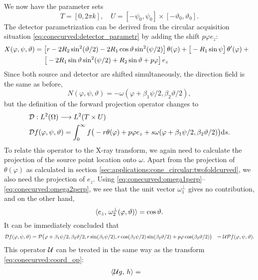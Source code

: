 \documentclass{amsart}
\renewcommand*{\phi}{\varphi}
\begin{document}
We now have the parameter sets
%
\begin{equation}
 \label{eq:hconecurved:params}
 T = [0, 2\pi k], \quad U = [-\psi_0, \psi_0] \times [-\vartheta_0, \vartheta_0].
\end{equation}
%
The detector parametrization can be derived from the circular acquisition situation \eqref{eq:conecurved:detector_parametr} by adding the 
shift $p \phi e_z$:
%
\begin{align}
 \label{eq:hconecurved:detector_parametr}
 X(\phi, \psi, \vartheta)
 &= \big[ r - 2R_2 \sin^2(\vartheta/2) - 2R_1 \cos\vartheta \sin^2(\psi/2) \big]\, \theta(\phi) + \big[-R_1 \sin\psi\big]\, 
 \theta'(\phi) + \phantom{x} \\
 &\hspace{14pt} \big[ -2R_1 \sin\vartheta\sin^2(\psi/2) + R_2\sin\vartheta + p\phi \big]\, e_z \notag 
\end{align}
%
Since both source and detector are shifted simultaneously, the direction field is the same as before,
%
\begin{equation}
 \label{eq:hconecurved:direction_field}
 N(\phi, \psi, \vartheta) = -\omega(\phi + \beta_1\psi/2, \beta_2\vartheta/2),
\end{equation} 
%
but the definition of the forward projection operator changes to
%
\begin{align}
 &\OPD: L^2(\Omega) \Lto L^2(T \times U) \notag \\
 \label{eq:hconecurved:fwdproj}
 &\OPD f(\phi, \psi, \vartheta) = \int_0^\infty f\big(-r\theta(\phi) + p\phi e_z + s \omega(\phi + \beta_1\psi/2, \beta_2\vartheta/2)\big)
 \D s.
\end{align}
%
To relate this operator to the X-ray transform, we again need to calculate the projection of the source point location onto $\omega$. Apart 
from the projection of $\theta(\phi)$ as calculated in section \ref{sec:applications:cone_circular:twofoldcurved}, we also need the 
projection of $e_z$. Using \eqref{eq:conecurved:omega1perp}--\eqref{eq:conecurved:omega2perp}, we see that the unit vector 
$\omega_1^\perp$ gives no contribution, and on the other hand,
%
\begin{equation*}
 \INNER{e_z}{\omega_2^\perp(\phi, \vartheta)} = \cos\vartheta.
\end{equation*}
%
%
It can be immediately concluded that
%
\begin{align*}
 \OPD f(\phi, \psi, \vartheta) 
 &= \OPP\big( \phi + \beta_1\psi/2, \beta_2\vartheta/2, r\sin(\beta_1\psi/2), r\cos(\beta_1\psi/2)\sin(\beta_2\vartheta/2) + 
 p\phi \cos(\beta_2\vartheta/2) \big)
 &= \OPU \OPP f(\phi, \psi, \vartheta).
\end{align*}
%
This operator ${\mathcal{U}}$ can be treated in the same way as the transform \eqref{eq:conecurved:coord_op}:
%
\begin{align*}
 \langle {\ensuremath{\mathcal{U}}} g,\,h\rangle
 &= 
\end{align*}
\end{document}

